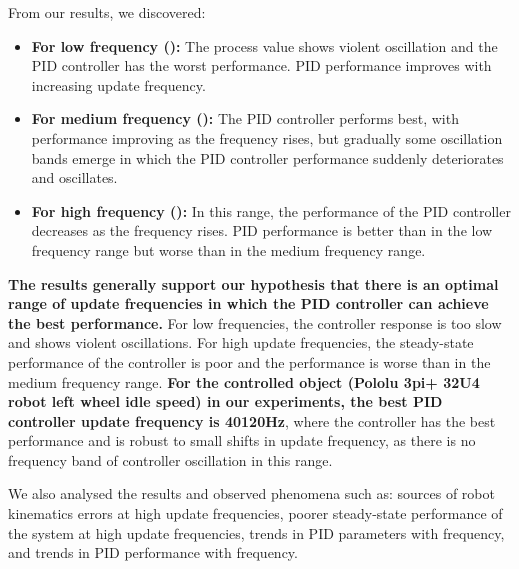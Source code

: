 \documentclass[conference]{IEEEtran}
\begin{document}
From our results, we discovered:
\begin{itemize}
    \item \textbf{For low frequency ():} The process value shows violent oscillation and the PID controller has the worst performance. PID performance improves with increasing update frequency. 
    \item \textbf{For medium frequency ():} The PID controller performs best, with performance improving as the frequency rises, but gradually some oscillation bands emerge in which the PID controller performance suddenly deteriorates and oscillates.
    \item \textbf{For high frequency ():} In this range, the performance of the PID controller decreases as the frequency rises. PID performance is better than in the low frequency range but worse than in the medium frequency range.
\end{itemize}

\textbf{The results generally support our hypothesis that there is an optimal range of update frequencies in which the PID controller can achieve the best performance.} For low frequencies, the controller response is too slow and shows violent oscillations. For high update frequencies, the steady-state performance of the controller is poor and the performance is worse than in the medium frequency range. \textbf{For the controlled object (Pololu 3pi+ 32U4 robot left wheel idle speed) in our experiments, the best PID controller update frequency is 40\bm{$\sim$}120Hz}, where the controller has the best performance and is robust to small shifts in update frequency, as there is no frequency band of controller oscillation in this range.

We also analysed the results and observed phenomena such as: sources of robot kinematics errors at high update frequencies, poorer steady-state performance of the system at high update frequencies, trends in PID parameters with frequency, and trends in PID performance with frequency.
\end{document}
